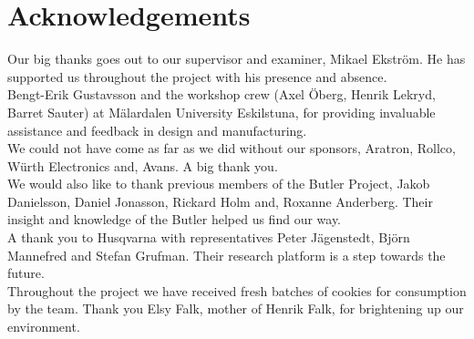 \section*{Acknowledgements}
\noindent Our big thanks goes out to our supervisor and examiner, Mikael Ekström. He has supported us throughout the project with his presence and absence.\\ 

\noindent Bengt-Erik Gustavsson and the workshop crew (Axel Öberg, Henrik Lekryd, Barret Sauter) at Mälardalen University Eskilstuna, for providing invaluable assistance and feedback in design and manufacturing. \\

\noindent We could not have come as far as we did without our sponsors, Aratron, Rollco, W\"{u}rth Electronics and, Avans. A big thank you. \\

\noindent We would also like to thank previous members of the Butler Project, Jakob Danielsson, Daniel Jonasson, Rickard Holm and, Roxanne Anderberg. Their insight and knowledge of the Butler helped us find our way.\\

\noindent A thank you to Husqvarna with representatives Peter Jägenstedt, Björn Mannefred and Stefan Grufman. Their research platform is a step towards the future.\\

\noindent Throughout the project we have received fresh batches of cookies for consumption by the team. Thank you Elsy Falk, mother of Henrik Falk, for brightening up our environment.\\